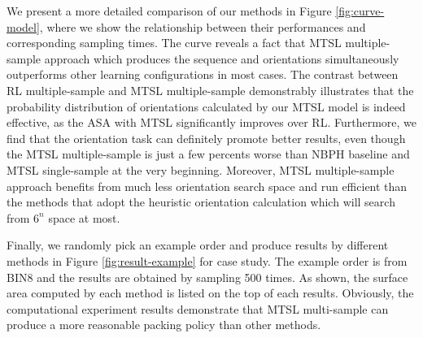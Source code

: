 We present a more detailed comparison of our methods in Figure \ref{fig:curve-model}, where we show the relationship between their performances and corresponding sampling times. The curve reveals a fact that MTSL multiple-sample approach which produces the sequence and orientations simultaneously outperforms other learning configurations in most cases. The contrast between RL multiple-sample and MTSL multiple-sample demonstrably illustrates that the probability distribution of orientations calculated by our MTSL model is indeed effective, as the ASA with MTSL significantly improves over RL. Furthermore, we find that the orientation task can definitely promote better results, even though the MTSL multiple-sample is just a few percents worse than NBPH baseline and MTSL single-sample at the very beginning. Moreover, MTSL multiple-sample approach benefits from much less orientation search space and run efficient than the methods that adopt the heuristic orientation calculation which will search from $6^n$ space at most.
%
\begin{figure*}[h]
	\centering
	\caption{Results for multi-task binpacking network. (a), (b), (c) shows the result of BIN8, BIN10, BIN12, respectively.}
	\label{fig:curve-model}
	\vspace{-10pt}
\end{figure*}

Finally, we randomly pick an example order and produce results by different methods in Figure \ref{fig:result-example} for case study. The example order is from BIN8 and the results are obtained by sampling 500 times.
As shown, the surface area computed by each method is listed on the top of each results. Obviously, the computational experiment results demonstrate that MTSL multi-sample can produce a more reasonable packing policy than other methods. 

